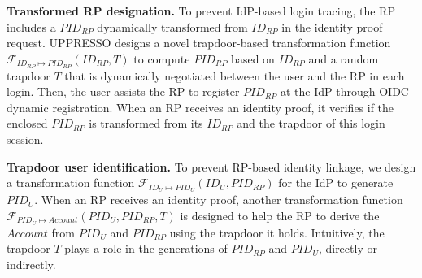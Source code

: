 \noindent \textbf{Transformed RP designation.} To prevent IdP-based login tracing, the RP includes a $PID_{RP}$ dynamically transformed from $ID_{RP}$ in the identity proof request. UPPRESSO designs a novel trapdoor-based transformation function $\mathcal{F}_{ID_{RP} \mapsto PID_{RP}}(ID_{RP}, T)$ to compute $PID_{RP}$ based on $ID_{RP}$ and a random trapdoor $T$ that is dynamically negotiated between the user and the RP in each login. Then, the user assists the RP to register $PID_{RP}$ at the IdP through OIDC dynamic registration. When an RP receives an identity proof, it verifies if the enclosed $PID_{RP}$ is transformed from its $ID_{RP}$ and the trapdoor of this login session.



\noindent \textbf{Trapdoor user identification.} To prevent RP-based identity linkage, we design a transformation function $\mathcal{F}_{ID_{U} \mapsto PID_U}(ID_U, PID_{RP})$ for the IdP to generate $PID_U$. When an RP receives an identity proof, another transformation function $\mathcal{F}_{PID_{U} \mapsto Account}(PID_U, PID_{RP}, T)$ is designed to help the RP to derive the $Account$ from $PID_U$ and $PID_{RP}$ using the trapdoor it holds. Intuitively, the trapdoor $T$ plays a role in the generations of $PID_{RP}$ and $PID_U$, directly or indirectly.


